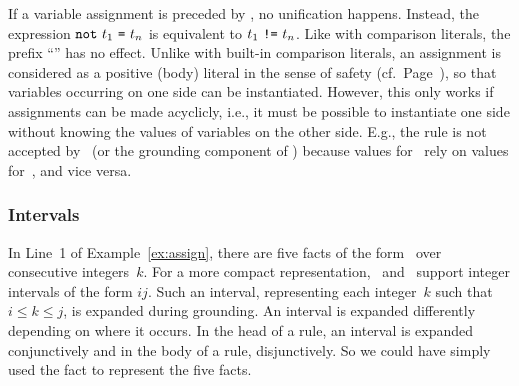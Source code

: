 \begin{note}
If a variable assignment is preceded by , 
no unification happens.
Instead, the expression $\texttt{not}~t_1~\texttt{=}~t_n$ is equivalent to $t_1~\texttt{!=}~t_n$.
Like with comparison literals, the prefix ``'' has no effect.
Unlike with built-in comparison literals,
an assignment is considered as
a positive (body) literal in the sense of safety (cf.\ Page~\pageref{pg:safe}),
so that variables occurring on one side can be instantiated.
However, this only works if assignments
can be made acyclicly, i.e.,
it must be possible to instantiate one side
without knowing the values of variables on
the other side.
E.g., the rule 
is not accepted by \gringo\ (or the grounding component of \clingo)
because values for~ rely on values for~, and vice versa.
%
%
\end{note}

\subsubsection{Intervals}\label{subsec:gringo:interval}

In Line~1 of Example~\ref{ex:assign},
there are five facts of the form~
over consecutive integers~$k$.
For a more compact representation,
\gringo\ and \clingo\ support integer intervals of the form $i$$j$.
Such an interval, representing each integer~$k$ such that $i\leq k\leq j$,
is expanded during grounding.
An interval is expanded differently depending on where it occurs.
In the head of a rule, an interval is expanded conjunctively
and in the body of a rule, disjunctively.
So we could have simply used the fact  to represent the five facts.

